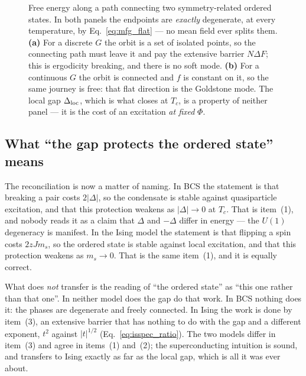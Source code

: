 \documentclass[10pt,a4paper]{article}
\theoremstyle{remark}
\begin{document}
\begin{figure}[htbp]
\caption{Free energy along a path connecting two symmetry-related ordered
states. In both panels the endpoints are \emph{exactly} degenerate, at every
temperature, by Eq.~\eqref{eq:mfg_flat} --- no mean field ever splits them.
\textbf{(a)} For a discrete $G$ the orbit is a set of isolated points, so the
connecting path must leave it and pay the extensive barrier $N\Delta F$; this is
ergodicity breaking, and there is no soft mode. \textbf{(b)} For a continuous $G$
the orbit is connected and $f$ is constant on it, so the same journey is free:
that flat direction is the Goldstone mode. The local gap $\Delta_{\rm loc}$,
which is what closes at $T_c$, is a property of neither panel --- it is the cost
of an excitation \emph{at fixed} $\Phi$.}
\label{fig:mfgeneric}
\end{figure}

\subsection{What ``the gap protects the ordered state'' means}
\label{sec:mfgeneric:reconcile}

The reconciliation is now a matter of naming. In BCS the statement is that
breaking a pair costs $2|\Delta|$, so the condensate is stable against
quasiparticle excitation, and that this protection weakens as $|\Delta|\to0$ at
$T_c$. That is item~(1), and nobody reads it as a claim that $\Delta$ and
$-\Delta$ differ in energy --- the $U(1)$ degeneracy is manifest. In the Ising
model the statement is that flipping a spin costs $2zJm_s$, so the ordered state
is stable against local excitation, and that this protection weakens as
$m_s\to0$. That is the same item~(1), and it is equally correct.

What does \emph{not} transfer is the reading of ``the ordered state'' as ``this
one rather than that one''. In neither model does the gap do that work. In BCS
nothing does it: the phases are degenerate and freely connected. In Ising the
work is done by item~(3), an extensive barrier that has nothing to do with the
gap and a different exponent, $t^{2}$ against $|t|^{1/2}$
(Eq.~\eqref{eq:isspec_ratio}). The two models differ in item~(3) and agree in
items~(1) and~(2); the superconducting intuition is sound, and transfers to Ising
exactly as far as the local gap, which is all it was ever about.
\end{document}

